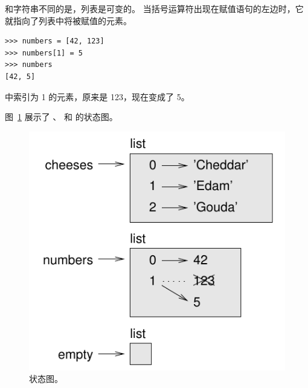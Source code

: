 %

和字符串不同的是，列表是可变的。
当括号运算符出现在赋值语句的左边时，它就指向了列表中将被赋值的元素。


\begin{lstlisting}
>>> numbers = [42, 123]
>>> numbers[1] = 5
>>> numbers
[42, 5]
\end{lstlisting}

%

 中索引为 1 的元素，原来是 123，现在变成了 5。
  

  

图~\ref{fig.liststate} 展示了  、  和  的状态图。

\begin{figure}
\centerline
{\includegraphics[scale=0.8]{../source/figs/liststate.pdf}}
\caption{状态图。}
\label{fig.liststate}
\end{figure}

  

